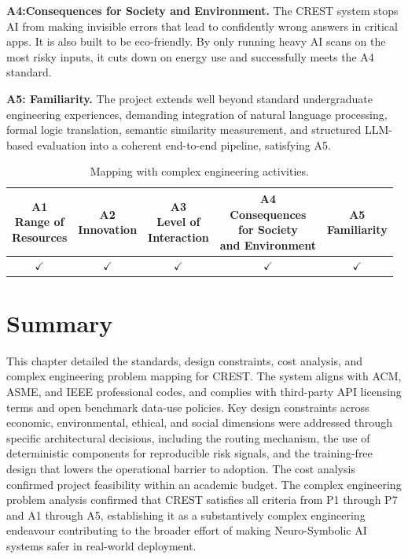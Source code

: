\textbf{A4:Consequences for Society and Environment. }The CREST system stops AI from making invisible errors that lead to confidently wrong answers in critical apps. It is also built to be eco-friendly. By only running heavy AI scans on the most risky inputs, it cuts down on energy use and successfully meets the A4 standard.

\textbf{A5: Familiarity.}
The project extends well beyond standard undergraduate engineering experiences, demanding integration of natural language processing, formal logic translation, semantic similarity measurement, and structured LLM-based evaluation into a coherent end-to-end pipeline, satisfying A5.


\begin{table}[htpb]
\centering

\vspace{0.5em}
\begin{tabular}{|c|c|c|c|c|}
\hline
\thead{A1\\Range of\\Resources} & \thead{A2\\Innovation} & \thead{A3\\Level of\\Interaction} & \thead{A4\\Consequences\\for Society\\and Environment} & \thead{A5\\Familiarity} \\ \hline
$\checkmark$ & $\checkmark$ & $\checkmark$ & $\checkmark$ & $\checkmark$ \\ \hline
\end{tabular}
\caption{Mapping with complex engineering activities.}
\end{table}
\section{Summary}

This chapter detailed the standards, design constraints, cost analysis, and complex engineering problem mapping for CREST. The system aligns with ACM, ASME, and IEEE professional codes, and complies with third-party API licensing terms and open benchmark data-use policies. Key design constraints across economic, environmental, ethical, and social dimensions were addressed through specific architectural decisions, including the routing mechanism, the use of deterministic components for reproducible risk signals, and the training-free design that lowers the operational barrier to adoption. The cost analysis confirmed project feasibility within an academic budget. The complex engineering problem analysis confirmed that CREST satisfies all criteria from P1 through P7 and A1 through A5, establishing it as a substantively complex engineering endeavour contributing to the broader effort of making Neuro-Symbolic AI systems safer in real-world deployment.

